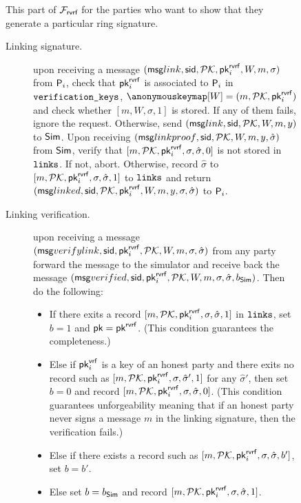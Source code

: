 \begin{figure}\scriptsize
	\begin{tcolorbox}
		{  This part of $ \mathcal{F}_{\textsf{rvrf}} $ for the parties who want to show that they generate a particular ring signature.
			
		
			\begin{description}
				\item[Linking signature.] upon receiving a message $(\mathsf{msg}{link}, \textsf{sid}, {\mathcal{PK}}, \mathsf{pk}^{\mathsf{rvrf}}_i, W, m,\sigma)$ from $\mathsf{P}_i$, check that $\mathsf{pk}^{\mathsf{rvrf}}_i $ is associated to $\mathsf{P}_i$ in $ \texttt{verification\_keys} $, $ \anonymouskeymap[W] = (m, \pkring, \pkrvrf_i) $ and 
				check whether $ [m, W, \sigma, 1] $ is stored. If any of them fails, ignore the request. Otherwise,
				send $(\mathsf{msg}{link}, \textsf{sid}, {\mathcal{PK}}, W, m, y)$ to $\mathsf{Sim}$. Upon receiving $(\mathsf{msg}{linkproof}, \textsf{sid}, {\mathcal{PK}}, W, m, y, \hat \sigma)$ from $\mathsf{Sim}$, verify that $ [m, {\mathcal{PK}}, \mathsf{pk}^{\mathsf{rvrf}}_i, \sigma, \hat{\sigma}, 0] $ is not stored in $ \texttt{links} $. If not, abort. Otherwise,  record $\hat\sigma$ to $[m, {\mathcal{PK}}, \mathsf{pk}^{\mathsf{rvrf}}_i,\sigma, \hat{\sigma}, 1]$ to $ \texttt{links} $ and return $(\mathsf{msg}{linked}, \textsf{sid}, {\mathcal{PK}}, \mathsf{pk}^{\mathsf{rvrf}}_i,W, m, y,\sigma, \hat\sigma)$ to $\mathsf{P}_i$.
				\item[Linking verification.] upon receiving a message $(\mathsf{msg}{verifylink}, \textsf{sid}, \mathsf{pk}^{\mathsf{rvrf}}_i, {\mathcal{PK}}, W, m,\sigma,\hat\sigma)$ from any party forward the message to the simulator and receive back  the message $(\mathsf{msg}{verified}, \textsf{sid}, \mathsf{pk}^{\mathsf{rvrf}}_i, {\mathcal{PK}}, W,m, \sigma,\hat\sigma,  b_{\mathsf{Sim}})$. Then do the following:
				
				\begin{itemize}
					\item If there exits a record $ [m, {\mathcal{PK}},\mathsf{pk}^{\mathsf{rvrf}}_i,\sigma,\hat\sigma, 1] $ in $ \texttt{links} $, set $ b = 1 $ and $ \mathsf{pk} = \mathsf{pk}^{\mathsf{rvrf}} $. (This condition guarantees the completeness.)
					\item Else if $ \mathsf{pk}^{\mathsf{vrf}}_i $ is a key of an honest party and there exits no record such as $ [m, {\mathcal{PK}},\mathsf{pk}^{\mathsf{rvrf}}_i,\sigma,\hat\sigma',  1] $ for any  $  \hat\sigma'$, then set $ b = 0 $ and record $ [m, {\mathcal{PK}},\mathsf{pk}^{\mathsf{rvrf}}_i,\sigma,\hat\sigma,  0] $. (This condition guarantees unforgeability meaning that if an honest party never signs a message $ m $ in the linking signature, then the verification fails.)
					\item Else if there exists a record  such as $ [m, {\mathcal{PK}},\mathsf{pk}^{\mathsf{rvrf}}_i,\sigma,\hat\sigma,  b'] $, set $ b = b' $. 
					\item Else set $ b = b_{\mathsf{Sim}} $ and record $ [m, {\mathcal{PK}},\mathsf{pk}^{\mathsf{rvrf}}_i,\sigma,\hat\sigma,  1] $. 
				\end{itemize}
				

\end{description}}
\end{tcolorbox}
\end{figure}
